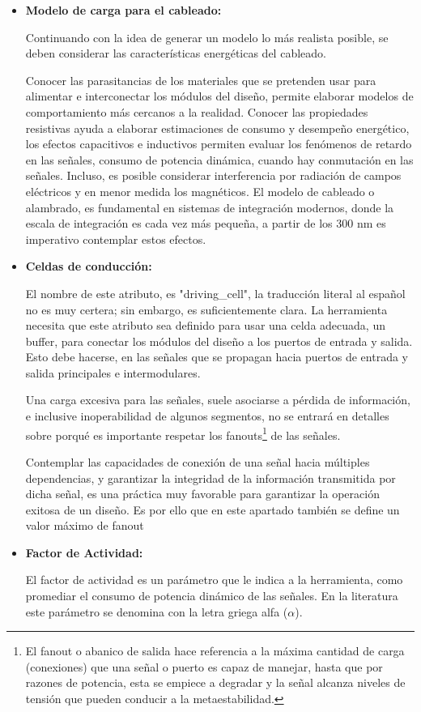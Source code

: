 \begin{itemize}
\item \textbf{Modelo de carga para el cableado:} {Continuando con la idea de generar un modelo lo más realista posible, se deben considerar las características energéticas del cableado.

Conocer las parasitancias de los materiales que se pretenden usar para alimentar e interconectar los módulos del diseño, permite elaborar modelos de comportamiento más cercanos a la realidad. Conocer las propiedades resistivas ayuda a elaborar estimaciones de consumo y desempeño energético, los efectos capacitivos e inductivos permiten evaluar los fenómenos de retardo en las señales, consumo de potencia dinámica, cuando hay conmutación en las señales. Incluso, es posible considerar interferencia por radiación de campos eléctricos y en menor medida los magnéticos. El modelo de cableado o alambrado, es fundamental en sistemas de integración modernos, donde la escala de integración es cada vez más pequeña, a partir de los 300 nm es imperativo contemplar estos efectos.}

\item \textbf{Celdas de conducción:} {El nombre de este atributo, es "driving\_cell", la traducción literal al español no es muy certera; sin embargo, es suficientemente clara. La herramienta necesita que este atributo sea definido para usar una celda adecuada, un buffer, para conectar los módulos del diseño a los puertos de entrada y salida. Esto debe hacerse, en las señales que se propagan hacia puertos de entrada y salida principales e intermodulares.

Una carga excesiva para las señales, suele asociarse a pérdida de información, e inclusive inoperabilidad de algunos segmentos, no se entrará en detalles sobre porqué es importante respetar los fanouts\footnote{El fanout o abanico de salida hace referencia a la máxima cantidad de carga (conexiones) que una señal o puerto es capaz de manejar, hasta que por razones de potencia, esta se empiece a degradar y la señal alcanza niveles de tensión que pueden conducir a la metaestabilidad.} de las señales.

Contemplar las capacidades de conexión de una señal hacia múltiples dependencias, y garantizar la integridad de la información transmitida por dicha señal, es una práctica muy favorable para garantizar la operación exitosa de un diseño. Es por ello que en este apartado también se define un valor máximo de fanout}

\item \textbf{Factor de Actividad:} {El factor de actividad es un parámetro que le indica a la herramienta, como promediar el consumo de potencia dinámico de las señales. En la literatura este parámetro se denomina con la letra griega alfa (\textbf{$\alpha$}).

}
\end{itemize}
